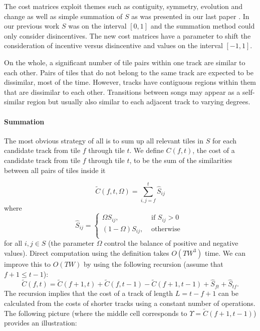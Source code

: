 \documentclass[twocolumn]{article}
\begin{document}
	The cost matrices exploit themes such as contiguity, symmetry, evolution and change as well as simple summation of $S$ as was presented in our last paper \citep{scarfe2013long}. In our previous work $S$ was on the interval $[0,1]$ and the summation method could only consider disincentives. The new cost matrices have a parameter to shift the consideration of incentive versus disincentive and values on the interval $[-1,1]$.
	
	On the whole, a significant number of tile pairs within one track are similar to each other. Pairs of tiles that do not belong to the same track are expected to be dissimilar, most of the time. However, tracks have contiguous regions within them that are dissimilar to each other. Transitions between songs may appear as a self-similar region but usually also similar to each adjacent track to varying degrees.  
	
	\paragraph{Summation}
	
	The most obvious strategy of all is to sum up all relevant tiles in $S$ for each candidate track from tile $f$ through tile $t$. We define $C(f,t)$, the cost of a candidate track from tile $f$ through tile $t$, to be the sum of the similarities between all pairs of tiles inside it

	\begin{dmath*}
		\tilde C(f,t, \Omega) =  \sum_{i,j=f}^{t} \hat S_{ij}
	\end{dmath*}
where
	\begin{dmath*}
		\hat S_{ij}=	{ \left\{
			\begin{array}{ll}
				\Omega S_{ij},  & \text{~if~}S_{ij} > 0   \\
				 \left( 1-\Omega \right) S_{ij}, & \mbox{~otherwise~}\\
			\end{array}
			\right.} 
	\end{dmath*} 
for all $i,j \in S$ (the parameter $\Omega$ control the balance of
positive and negative values). Direct computation using the definition
takes $O(TW^3)$ time. We can improve this to
$O(TW)$ by using the following recursion (assume that $f+1 \le t-1$):
	\begin{dmath*}
		\tilde C(f,t) = \tilde C(f+1,t) + \tilde C(f,t-1) - \tilde C(f+1,t-1) + \hat S_{ft} + \hat S_{tf}.
	\end{dmath*} 
The recursion implies that the cost of a track of length $L=t-f+1$ can
be calculated from the costs of shorter tracks using a constant number
of operations. The following picture (where the middle cell
corresponds to $\Upsilon = \tilde{C}(f+1,t-1)$) provides an
illustration:
	
\end{document}
